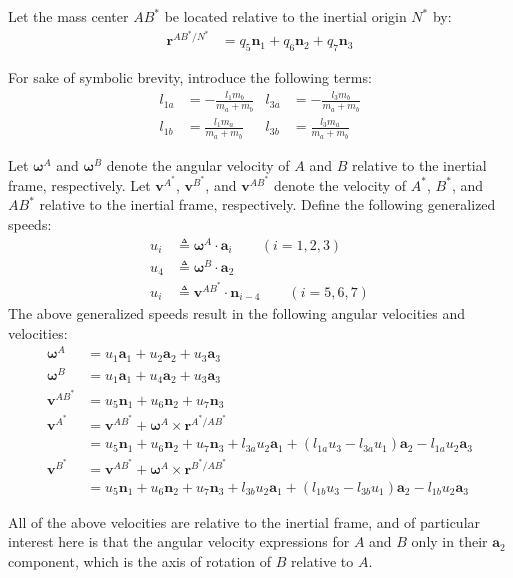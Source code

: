 \documentclass[letterpaper,11pt]{article}
\newcommand{\bs}[1]{ \boldsymbol{ #1 } }
\begin{document}
Let the mass center $AB^*$ be located relative to the inertial origin $N^*$ by:
\begin{align*}
  \bs{r}^{AB^*/N^*} & = q_5 \bs{n}_1 + q_6 \bs{n}_2 + q_7 \bs{n}_3
\end{align*}

For sake of symbolic brevity, introduce the following terms:
\begin{align*}
  l_{1a} & = -\frac{l_1 m_b}{m_a + m_b} &
  l_{3a} & = -\frac{l_3 m_b}{m_a + m_b} \\
  l_{1b} & = \frac{l_1 m_a}{m_a + m_b} &
  l_{3b} & = \frac{l_3 m_a}{m_a + m_b}
\end{align*}

Let $\bs{\omega}^A$ and $\bs{\omega}^B$ denote the angular velocity of $A$ and $B$
relative to the inertial frame, respectively.  Let $\bs{v}^{A^*}$,
$\bs{v}^{B^*}$, and $\bs{v}^{AB^*}$ denote the
velocity of $A^*$, $B^*$, and $AB^*$ relative to the inertial frame,
respectively.  Define the following generalized speeds:
\begin{align}
  u_i & \triangleq \bs{\omega}^A \cdot \bs{a}_i  \qquad  (i = 1,2,3)
  \label{u_defs1} \\
  u_4 & \triangleq \bs{\omega}^B \cdot \bs{a}_2 \label{u_defs2} \\
  u_i & \triangleq \bs{v}^{AB^*} \cdot \bs{n}_{i-4} \qquad  (i = 5,6,7)
  \label{u_defs3}
\end{align}
The above generalized speeds result in the following angular velocities and
velocities:
\begin{align*}
  \bs{\omega}^A & = u_1 \bs{a}_1 + u_2 \bs{a}_2 + u_3 \bs{a}_3 \\
  \bs{\omega}^B & = u_1 \bs{a}_1 + u_4 \bs{a}_2 + u_3 \bs{a}_3 \\
  \bs{v}^{AB^*} & = u_5 \bs{n}_1 + u_6 \bs{n}_2 + u_7 \bs{n}_3 \\
  \bs{v}^{A^*}  & = \bs{v}^{AB^*} + \bs{\omega}^A \times \bs{r}^{A^*/AB^*} \\
  & = u_5 \bs{n}_1 + u_6 \bs{n}_2 + u_7 \bs{n}_3 +l_{3a}u_2\bs{a}_1 +
  (l_{1a}u_3 - l_{3a}u_1)\bs{a}_2 - l_{1a}u_2\bs{a}_3 \\
  \bs{v}^{B^*}  & = \bs{v}^{AB^*} + \bs{\omega}^A \times \bs{r}^{B^*/AB^*} \\
  & = u_5 \bs{n}_1 + u_6 \bs{n}_2 + u_7 \bs{n}_3 +l_{3b}u_2\bs{a}_1 +
  (l_{1b}u_3 - l_{3b}u_1)\bs{a}_2 - l_{1b}u_2\bs{a}_3
\end{align*}

All of the above velocities are relative to the inertial frame, and of
particular interest here is that the angular velocity expressions for $A$ and
$B$ only in their $\bs{a}_2$ component, which is the axis of rotation of
$B$ relative to $A$.
\end{document}
